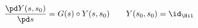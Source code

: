 \begin{equation}	\label{12.Texp1}
\frac{\pd Y(s,s_0)}{\pd s} = G(s)\circ Y(s,s_0)
\qquad
Y(s_0,s_0) = \id_\Hil
	\end{equation}

